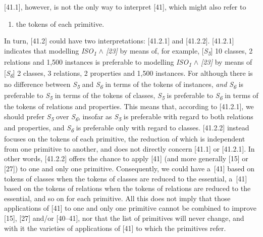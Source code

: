 [41.1], however, is not the only way to interpret [41], which might also refer to



\setcounter{saveenum}{\value{enumi}}

\begin{enumerate}

\setcounter{enumi}{\value{saveenum}}

\item the tokens of each primitive.

\end{enumerate}

In turn, [41.2] could have two interpretations: [41.2.1] and [41.2.2]. [41.2.1] indicates that modelling \textit{ISO}\textit{\textsubscript{1}} \textit{${\wedge}$ [23]} by means of, for example, [\textit{S}\textit{\textsubscript{5}}] 10 classes, 2 relations and 1,500 instances is preferable to modelling \textit{ISO}\textit{\textsubscript{1}} \textit{${\wedge}$ [23]} by means of [\textit{S}\textit{\textsubscript{6}}] 2 classes, 3 relations, 2 properties and 1,500 instances. For although there is no difference between \textit{S}\textit{\textsubscript{5}} and \textit{S}\textit{\textsubscript{6}} in terms of the tokens of instances, \textit{and} \textit{S}\textit{\textsubscript{6}} is preferable to \textit{S}\textit{\textsubscript{5}} in terms of the tokens of classes, \textit{S}\textit{\textsubscript{5}} is preferable to \textit{S}\textit{\textsubscript{6}} in terms of the tokens of relations and properties. This means that, according to [41.2.1], we should prefer \textit{S}\textit{\textsubscript{5}} over \textit{S}\textit{\textsubscript{6}}, insofar as \textit{S}\textit{\textsubscript{5}} is preferable with regard to both relations and properties, and \textit{S}\textit{\textsubscript{6}} is preferable only with regard to classes. [41.2.2] instead focuses on the tokens of each primitive, the reduction of which is independent from one primitive to another, and does not directly concern [41.1] or [41.2.1]. In other words, [41.2.2] offers the chance to apply [41] (and more generally [15] or [27]) to one and only one primitive. Consequently, we could have a~[41] based on tokens of classes when the tokens of classes are reduced to the essential, a~[41] based on the tokens of relations when the tokens of relations are reduced to the essential, and so on for each primitive. All this does not imply that those applications of [41] to one and only one primitive cannot be combined to improve [15], [27] and/or [40–41], nor that the list of primitives will never change, and with it the varieties of applications of [41] to which the primitives refer.



